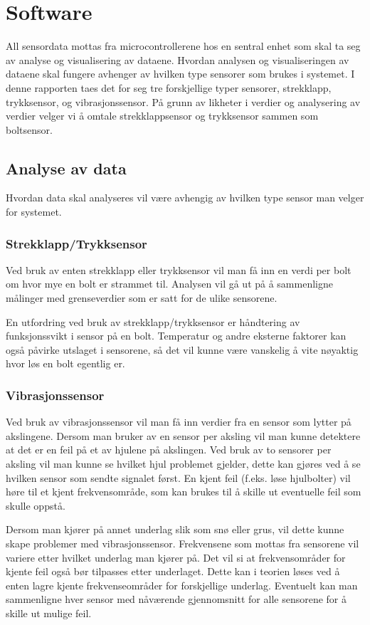 \section{Software}
All sensordata mottas fra microcontrollerene hos en sentral enhet som skal ta seg 
av analyse og visualisering av dataene. Hvordan analysen og visualiseringen av 
dataene skal fungere avhenger av hvilken type sensorer som brukes i systemet. I 
denne rapporten taes det for seg tre forskjellige typer sensorer, strekklapp, 
trykksensor, og vibrasjonssensor. På grunn av likheter i verdier og analysering 
av verdier velger vi å omtale strekklappsensor og trykksensor sammen som 
boltsensor.

\subsection{Analyse av data}
Hvordan data skal analyseres vil være avhengig av hvilken type sensor man velger 
for systemet. 

\subsubsection{Strekklapp/Trykksensor}
Ved bruk av enten strekklapp eller trykksensor vil man få inn en verdi per bolt 
om hvor mye en bolt er strammet til. Analysen vil gå ut på å sammenligne målinger 
med grenseverdier som er satt for de ulike sensorene.

En utfordring ved bruk av strekklapp/trykksensor er håndtering av 
funksjonssvikt i sensor på en bolt. Temperatur og andre eksterne faktorer kan 
også påvirke utslaget i sensorene, så det vil kunne være vanskelig å vite 
nøyaktig hvor løs en bolt egentlig er.

\subsubsection{Vibrasjonssensor}
Ved bruk av vibrasjonssensor vil man få inn verdier fra en sensor som lytter på 
akslingene. Dersom man bruker av en sensor per aksling vil man kunne detektere at 
det er en feil på et av hjulene på akslingen. Ved bruk av to sensorer per aksling 
vil man kunne se hvilket hjul problemet gjelder, dette kan gjøres ved å se 
hvilken sensor som sendte signalet først. En kjent feil (f.eks. løse hjulbolter) vil 
høre til et kjent frekvensområde, som kan brukes til å skille ut eventuelle 
feil som skulle oppstå.

Dersom man kjører på annet underlag slik som snø eller grus, vil dette kunne 
skape problemer med vibrasjonssensor. Frekvensene som mottas fra sensorene vil 
variere etter hvilket underlag man kjører på. Det vil si at frekvensområder for 
kjente feil også bør tilpasses etter underlaget. Dette kan i teorien løses ved å 
enten lagre kjente frekvenseområder for forskjellige underlag. Eventuelt kan man 
sammenligne hver sensor med nåværende gjennomsnitt for alle sensorene for å 
skille ut mulige feil. 

